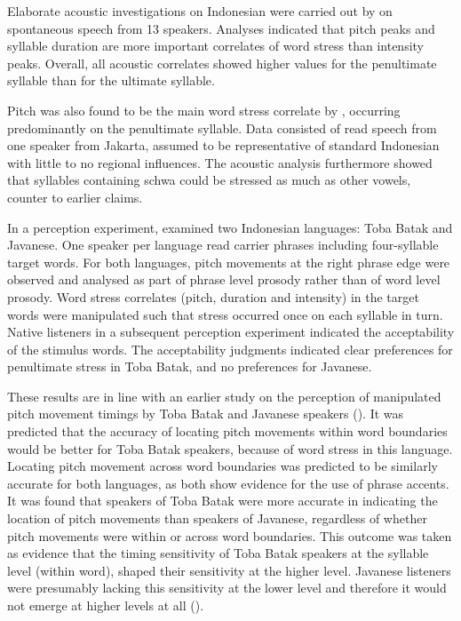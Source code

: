 Elaborate acoustic investigations on Indonesian were carried out by \citet{halim_intonation_1981} on spontaneous speech from 13 speakers. Analyses indicated that pitch peaks and syllable duration are more important correlates of word stress than intensity peaks. Overall, all acoustic correlates showed higher values for the penultimate syllable than for the ultimate syllable.\par

Pitch was also found to be the main word stress correlate by \citet{laksman_location_1994}, occurring predominantly on the penultimate syllable. Data consisted of read speech from one speaker from Jakarta, assumed to be representative of standard Indonesian with little to no regional influences. The acoustic analysis furthermore showed that syllables containing schwa could be stressed as much as other vowels, counter to earlier claims.\par

In a perception experiment, \citet{goedemans_stress_2007} examined two Indonesian languages: Toba Batak and Javanese. One speaker per language read carrier phrases including four-syllable target words. For both languages, pitch movements at the right phrase edge were observed and analysed as part of phrase level prosody rather than of word level prosody. Word stress correlates (pitch, duration and intensity) in the target words were manipulated such that stress occurred once on each syllable in turn. Native listeners in a subsequent perception experiment indicated the acceptability of the stimulus words. The acceptability judgments indicated clear preferences for penultimate stress in Toba Batak, and no preferences for Javanese.\par

These results are in line with an earlier study on the perception of manipulated pitch movement timings by Toba Batak and Javanese speakers (\citealt{vanheuven_effects_1997}). It was predicted that the accuracy of locating pitch movements within word boundaries would be better for Toba Batak speakers, because of word stress in this language. Locating pitch movement across word boundaries was predicted to be similarly accurate for both languages, as both show evidence for the use of phrase accents. It was found that speakers of Toba Batak were more accurate in indicating the location of pitch movements than speakers of Javanese, regardless of whether pitch movements were within or across word boundaries. This outcome was taken as evidence that the timing sensitivity of Toba Batak speakers at the syllable level (within word), shaped their sensitivity at the higher level. Javanese listeners were presumably lacking this sensitivity at the lower level and therefore it would not emerge at higher levels at all (\citealt{vanheuven_effects_1997}).\par

